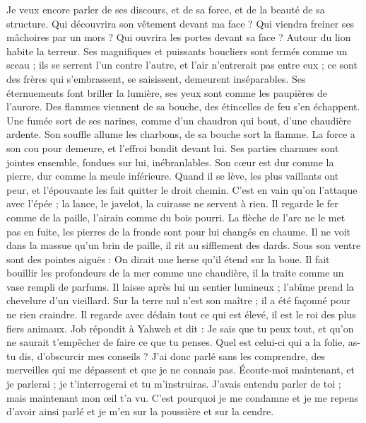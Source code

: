 \begin{multicols}{2}
Je veux encore parler de ses discours, et de sa force, et de la beauté de sa structure.
Qui découvrira son vêtement devant ma face ? Qui viendra freiner ses mâchoires par un mors ?
Qui ouvrira les portes devant sa face ? Autour du lion habite la terreur.
Ses magnifiques et puissants boucliers sont fermés comme un sceau ;
ils se serrent l'un contre l'autre, et l'air n'entrerait pas entre eux ;
ce sont des frères qui s'embrassent, se saisissent, demeurent inséparables.
Ses éternuements font briller la lumière, ses yeux sont comme les paupières de l'aurore.
Des flammes viennent de sa bouche, des étincelles de feu s'en échappent.
Une fumée sort de ses narines, comme d'un chaudron qui bout, d'une chaudière ardente.
Son souffle allume les charbons, de sa bouche sort la flamme.
La force a son cou pour demeure, et l'effroi bondit devant lui.
Ses parties charnues sont jointes ensemble, fondues sur lui, inébranlables.
Son cœur est dur comme la pierre, dur comme la meule inférieure.
Quand il se lève, les plus vaillants ont peur, et l'épouvante les fait quitter le droit chemin.
C'est en vain qu'on l'attaque avec l'épée ; la lance, le javelot, la cuirasse ne servent à rien.
Il regarde le fer comme de la paille, l'airain comme du bois pourri.
La flèche de l'arc ne le met pas en fuite, les pierres de la fronde sont pour lui changés en chaume.
Il ne voit dans la massue qu'un brin de paille, il rit au sifflement des dards.
Sous son ventre sont des pointes aiguës : On dirait une herse qu'il étend sur la boue.
Il fait bouillir les profondeurs de la mer comme une chaudière, il la traite comme un vase rempli de parfums.
Il laisse après lui un sentier lumineux ; l'abîme prend la chevelure d'un vieillard.
Sur la terre nul n'est son maître ; il a été façonné pour ne rien craindre.
Il regarde avec dédain tout ce qui est élevé, il est le roi des plus fiers animaux.
\VerseOne{}Job répondit à Yahweh et dit :
Je sais que tu peux tout, et qu'on ne saurait t'empêcher de faire ce que tu penses.
Quel est celui-ci qui a la folie, as-tu dis, d'obscurcir mes conseils ? J'ai donc parlé sans les comprendre, des merveilles qui me dépassent et que je ne connais pas.
Écoute-moi maintenant, et je parlerai ; je t'interrogerai et tu m'instruiras.
J'avais entendu parler de toi ; mais maintenant mon œil t'a vu.
C'est pourquoi je me condamne et je me repens d'avoir ainsi parlé et je m'en sur la poussière et sur la cendre.

\end{multicols}
